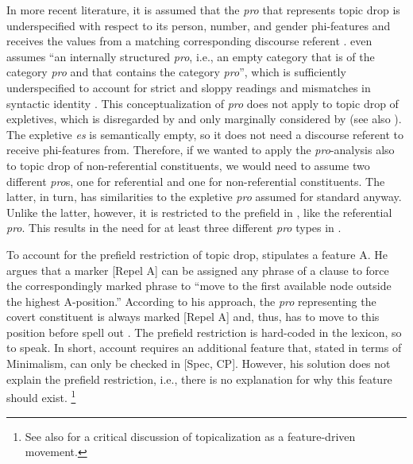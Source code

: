 In more recent literature, it is assumed that the \textit{pro} that represents topic drop is underspecified with respect to its person, number, and gender phi-features and receives the values from a matching corresponding discourse referent \citep[172]{freywald2020}.
\citet[172]{trutkowski2016} even assumes ``an internally structured \textit{pro}, i.e., an empty category that is of the category \textit{pro} and that contains the category \textit{pro}'', which is sufficiently underspecified to account for strict and sloppy readings and mismatches in syntactic identity \citep[173]{trutkowski2016}.
This conceptualization of \textit{pro} does not apply to topic drop of expletives,  which is disregarded by \citet[150]{freywald2020} and only marginally considered by \citet[120--121]{trutkowski2016} (see also ).
The expletive  \textit{es} is semantically empty, so it does not need a discourse referent to receive phi-features from.
Therefore, if we wanted to apply the \textit{pro}-analysis also to topic drop of non-referential constituents, we would need to assume two different \textit{pro}s, one for referential and one for non-referential constituents.
The latter, in turn, has similarities to the expletive  \textit{pro} assumed for standard  anyway.
Unlike the latter, however, it is restricted to the prefield in , like the referential \textit{pro}.
This results in the need for at least three different \textit{pro} types in .

To account for the prefield restriction of topic drop, \citet[94]{platzack1996} stipulates a feature A.
He argues that a marker [Repel A] can be assigned any phrase of a clause to force the correspondingly marked phrase to ``move to the first available node outside the highest A-position.''
According to his approach, the \textit{pro} representing the covert constituent is always marked [Repel A] and, thus, has to move to this position before spell out \citep[101]{platzack1996}.
The prefield restriction is hard-coded in the lexicon, so to speak.
In short,  account requires an additional feature that, stated in terms of Minimalism, can only be checked in [Spec, CP].
However, his solution does not explain the prefield restriction, i.e., there is no explanation for why this feature should exist.%
\footnote{See also \citet[762--763]{sternefeld2009} for a critical discussion of topicalization as a feature-driven movement.}
%

